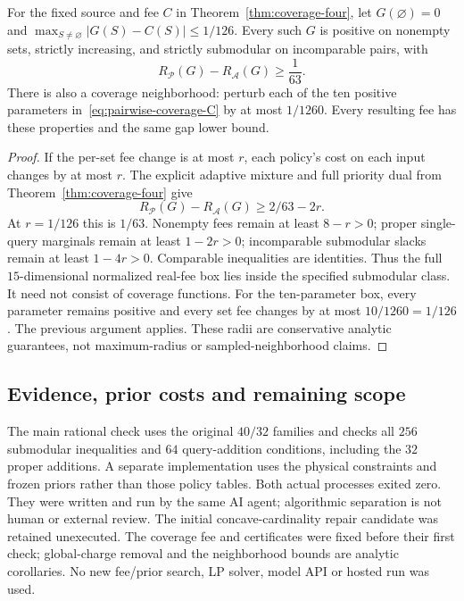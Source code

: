\begin{corollary}
\label{cor:coverage-robust}
For the fixed source and fee $C$ in Theorem~\ref{thm:coverage-four}, let
$G(\varnothing)=0$ and $\max_{S\ne\varnothing}|G(S)-C(S)|\leq1/126$.
Every such $G$ is positive on nonempty sets, strictly increasing, and
strictly submodular on incomparable pairs, with
\[
 R_{\mathcal P}(G)-R_{\mathcal A}(G)\geq\frac1{63}.
\]
There is also a coverage neighborhood: perturb each of the ten positive
parameters in~\eqref{eq:pairwise-coverage-C} by at most $1/1260$.
Every resulting fee has these properties and the same gap lower bound.
\end{corollary}
\begin{proof}
If the per-set fee change is at most $r$, each policy's cost on each
input changes by at most $r$. The explicit adaptive mixture and full
priority dual from Theorem~\ref{thm:coverage-four} give
\[
 R_{\mathcal P}(G)-R_{\mathcal A}(G)\geq2/63-2r.
\]
At $r=1/126$ this is $1/63$. Nonempty fees remain at least $8-r>0$;
proper single-query marginals remain at least $1-2r>0$; incomparable
submodular slacks remain at least $1-4r>0$. Comparable inequalities
are identities. Thus the full $15$-dimensional normalized real-fee box
lies inside the specified submodular class. It need not consist of
coverage functions. For the ten-parameter box, every parameter remains
positive and every set fee changes by at most $10/1260=1/126$.
The previous argument applies. These radii are conservative analytic
guarantees, not maximum-radius or sampled-neighborhood claims.
\end{proof}

\subsection{Evidence, prior costs and remaining scope}
The main rational check uses the original $40/32$ families and checks
all $256$ submodular inequalities and $64$ query-addition conditions,
including the $32$ proper additions. A separate implementation uses the
physical constraints and frozen priors rather than those policy tables.
Both actual processes exited zero. They were written and run by the
same AI agent; algorithmic separation is not human or external review.
The initial concave-cardinality repair candidate was retained unexecuted.
The coverage fee and certificates were fixed before their first check;
global-charge removal and the neighborhood bounds are analytic corollaries.
No new fee/prior search, LP solver, model API or hosted run was used.

